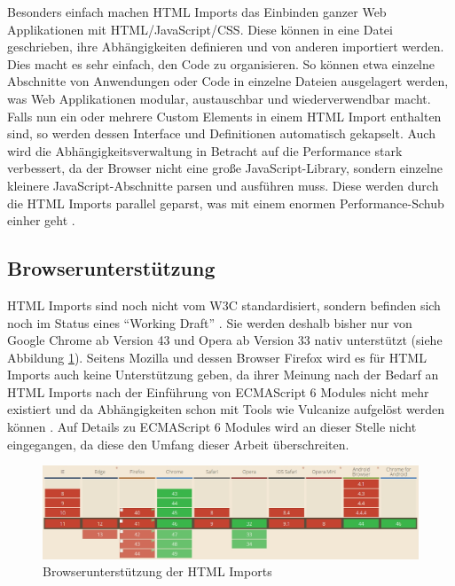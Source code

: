 Besonders einfach machen \ac{HTML} Imports das Einbinden ganzer Web Applikationen mit \ac{HTML}/JavaScript/\ac{CSS}. Diese können in eine Datei geschrieben, ihre Abhängigkeiten definieren und von anderen importiert werden. Dies macht es sehr einfach, den Code zu organisieren. So können etwa einzelne Abschnitte von Anwendungen oder Code in einzelne Dateien ausgelagert werden, was Web Applikationen modular, austauschbar und wiederverwendbar macht. Falls nun ein oder mehrere Custom Elements in einem \ac{HTML} Import enthalten sind, so werden dessen Interface und Definitionen automatisch gekapselt. Auch wird die Abhängigkeitsverwaltung in Betracht auf die Performance stark verbessert, da der Browser nicht eine große JavaScript-Library, sondern einzelne kleinere JavaScript-Abschnitte parsen und ausführen muss. Diese werden durch die \ac{HTML} Imports parallel geparst, was mit einem enormen Performance-Schub einher geht \cite{citeulike:13853647}.


\subsection{Browserunterstützung}\label{browserunterstuxfctzung}

\ac{HTML} Imports sind noch nicht vom \ac{W3C} standardisiert, sondern befinden sich noch im Status eines ``Working Draft'' \cite{citeulike:13853711}. Sie werden deshalb bisher nur von Google Chrome ab Version 43 und Opera ab Version 33 nativ unterstützt (siehe Abbildung \ref{fig:bdhtmli}). Seitens Mozilla und dessen Browser Firefox wird es für \ac{HTML} Imports auch keine Unterstützung geben, da ihrer Meinung nach der Bedarf an \ac{HTML} Imports nach der Einführung von ECMAScript 6 Modules nicht mehr existiert und da Abhängigkeiten schon mit Tools wie Vulcanize aufgelöst werden können \cite{citeulike:13881144}. Auf Details zu ECMAScript 6 Modules wird an dieser Stelle nicht eingegangen, da diese den Umfang dieser Arbeit überschreiten.

\begin{figure}[htbp]
 \centering
 \includegraphics[width=\linewidth]{kapitel2/bilder/5-html-imports-browserunterstuetzung}
 \caption{Browserunterstützung der HTML Imports}
 \label{fig:bdhtmli}
\end{figure}

